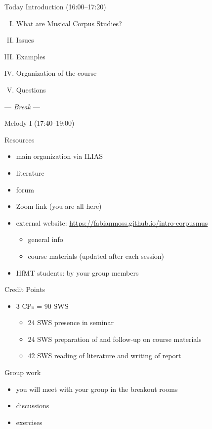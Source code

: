 
\begin{frame}{Today}
  Introduction (16:00--17:20)
  \begin{enumerate}[I.]
    \item What are Musical Corpus Studies?
    \item Issues
    \item Examples
    \item Organization of the course
    \item Questions
  \end{enumerate}

  --- \textit{Break} ---

  Melody I (17:40--19:00)
\end{frame}

\begin{frame}{Resources}
  \begin{itemize}
    \item main organization via ILIAS
    \item literature
    \item forum
    \item Zoom link (you are all here)
    \item external website: \url{https://fabianmoss.github.io/intro-corpusmus}
    \begin{itemize}
      \item general info
      \item course materials (updated after each session)
    \end{itemize}
    \item HfMT students: by your group members
  \end{itemize}
\end{frame}

\begin{frame}{Credit Points}
  \begin{itemize}
    \item 3 CPs = 90 SWS
    \begin{itemize}
      \item 24 SWS presence in seminar
      \item 24 SWS preparation of and follow-up on course materials
      \item 42 SWS reading of literature and writing of report
    \end{itemize}
  \end{itemize}
\end{frame}

\begin{frame}{Group work}
  \begin{itemize}
    \item you will meet with your group in the breakout rooms
    \item discussions
    \item exercises
  \end{itemize}
\end{frame}

